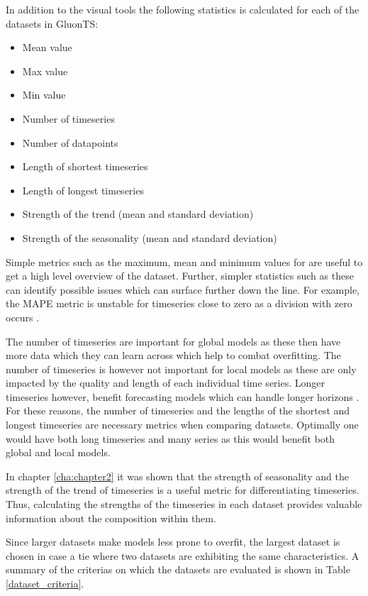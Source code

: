 In addition to the visual tools the following statistics is calculated for each of the datasets in GluonTS:

\begin{itemize}
  \item Mean value
  \item Max value
  \item Min value
  \item Number of timeseries
  \item Number of datapoints
  \item Length of shortest timeseries
  \item Length of longest timeseries
  \item Strength of the trend (mean and standard deviation)
  \item Strength of the seasonality (mean and standard deviation)
\end{itemize}

Simple metrics such as the maximum, mean and minimum values for are useful to get a high level overview of the dataset. Further, simpler statistics such as these can identify possible issues which can surface further down the line. For example, the MAPE metric is unstable for timeseries close to zero as a division with zero occurs \cite{hyndman_forecasting_3rd}.

The number of timeseries are important for global models as these then have more data which they can learn across which help to combat overfitting. The number of timeseries is however not important for local models as these are only impacted by the quality and length of each individual time series. Longer timeseries however, benefit forecasting models which can handle longer horizons \cite{makridakis_m4_2020}. For these reasons, the number of timeseries and the lengths of the shortest and longest timeseries are necessary metrics when comparing datasets. Optimally one would have both long timeseries and many series as this would benefit both global and local models.

In chapter \ref{cha:chapter2} it was shown that the strength of seasonality and the strength of the trend of timeseries is a useful metric for differentiating timeseries. Thus, calculating the strengths of the timeseries in each dataset provides valuable information about the composition within them.

Since larger datasets make models less prone to overfit, the largest dataset is chosen in case a tie where two datasets are exhibiting the same characteristics. A summary of the criterias on which the datasets are evaluated is shown in Table \ref{dataset_criteria}.


